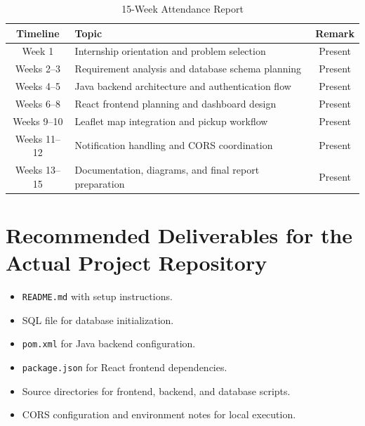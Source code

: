 \documentclass[12pt,a4paper]{report}
\begin{document}
\begin{table}[H]
\centering
\caption{15-Week Attendance Report}
\renewcommand{\arraystretch}{1.4}
\begin{tabular}{|c|p{9cm}|c|}
\hline
\textbf{Timeline} & \textbf{Topic} & \textbf{Remark} \\
\hline
Week 1 & Internship orientation and problem selection & Present \\
\hline
Weeks 2--3 & Requirement analysis and database schema planning & Present \\
\hline
Weeks 4--5 & Java backend architecture and authentication flow & Present \\
\hline
Weeks 6--8 & React frontend planning and dashboard design & Present \\
\hline
Weeks 9--10 & Leaflet map integration and pickup workflow & Present \\
\hline
Weeks 11--12 & Notification handling and CORS coordination & Present \\
\hline
Weeks 13--15 & Documentation, diagrams, and final report preparation & Present \\
\hline
\end{tabular}
\end{table}

\section*{Recommended Deliverables for the Actual Project Repository}
\begin{itemize}[leftmargin=1.2cm]
\item \texttt{README.md} with setup instructions.
\item SQL file for database initialization.
\item \texttt{pom.xml} for Java backend configuration.
\item \texttt{package.json} for React frontend dependencies.
\item Source directories for frontend, backend, and database scripts.
\item CORS configuration and environment notes for local execution.
\end{itemize}
\end{document}

